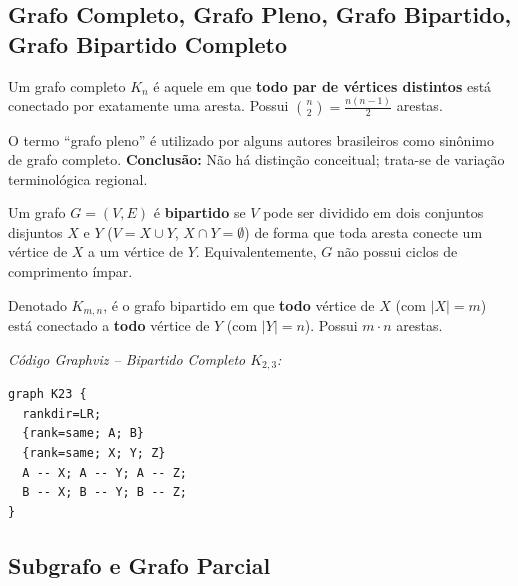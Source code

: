 \documentclass[12pt,a4paper]{article}
\begin{document}
\subsection{Grafo Completo, Grafo Pleno, Grafo Bipartido, Grafo Bipartido Completo}

\begin{description}[leftmargin=0pt]
  \item[Grafo Completo] Um grafo completo $K_n$ é aquele em que \textbf{todo par de vértices distintos} está conectado por exatamente uma aresta. Possui $\binom{n}{2} = \frac{n(n-1)}{2}$ arestas.

  \item[Grafo Pleno] O termo ``grafo pleno'' é utilizado por alguns autores brasileiros como sinônimo de grafo completo. \textbf{Conclusão:} Não há distinção conceitual; trata-se de variação terminológica regional.

  \item[Grafo Bipartido] Um grafo $G = (V, E)$ é \textbf{bipartido} se $V$ pode ser dividido em dois conjuntos disjuntos $X$ e $Y$ ($V = X \cup Y$, $X \cap Y = \emptyset$) de forma que toda aresta conecte um vértice de $X$ a um vértice de $Y$. Equivalentemente, $G$ não possui ciclos de comprimento ímpar.

  \item[Grafo Bipartido Completo] Denotado $K_{m,n}$, é o grafo bipartido em que \textbf{todo} vértice de $X$ (com $|X|=m$) está conectado a \textbf{todo} vértice de $Y$ (com $|Y|=n$). Possui $m \cdot n$ arestas.
\end{description}

\noindent\textit{Código Graphviz -- Bipartido Completo $K_{2,3}$:}
\begin{verbatim}
graph K23 {
  rankdir=LR;
  {rank=same; A; B}
  {rank=same; X; Y; Z}
  A -- X; A -- Y; A -- Z;
  B -- X; B -- Y; B -- Z;
}
\end{verbatim}

\subsection{Subgrafo e Grafo Parcial}
\end{document}
